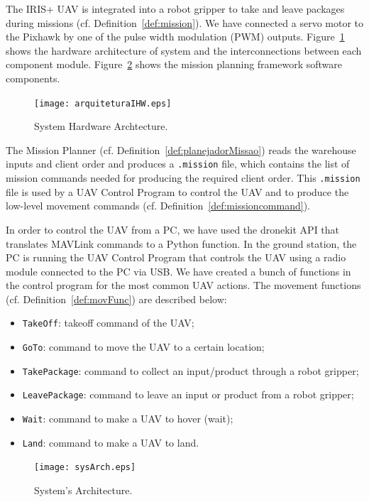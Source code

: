 \documentclass[conference,harvard,brazil,english]{sbatex}
\begin{document}
The IRIS+ UAV is integrated into a robot gripper to take and leave packages during missions (cf. Definition~\ref{def:mission}). We have connected a servo motor to the Pixhawk by one of the pulse width modulation (PWM) outputs. Figure~\ref{fig:hardArch} shows the hardware architecture of system and the interconnections between each component module. Figure~\ref{fig:sysArch} shows the mission planning framework software components.
%
\begin{figure}[H]
	\centering
	\texttt{[image: arquiteturaIHW.eps]}
	\caption{System Hardware Archtecture.}
	\label{fig:hardArch}
\end{figure}

The Mission Planner (cf. Definition~\ref{def:planejadorMissao}) reads the warehouse inputs and client order and produces a \texttt{.mission} file, which contains the list of mission commands needed for producing the required client order. This \texttt{.mission} file is used by a UAV Control Program to control the UAV and to produce the low-level movement commands (cf. Definition~\ref{def:missioncommand}).


In order to control the UAV from a PC, we have used the dronekit API that translates MAVLink commands to a Python function. In the ground station, the PC is running the UAV Control Program that controls the UAV using a radio module connected to the PC via USB. We have created a bunch of functions in the control program for the most common UAV actions. The movement functions (cf. Definition~\ref{def:movFunc}) are described below:
%
\begin{itemize}
\item \texttt{TakeOff}: takeoff command of the UAV;
\item \texttt{GoTo}: command to move the  UAV to a certain location;
\item \texttt{TakePackage}: command to collect an input/product through a robot gripper;
\item \texttt{LeavePackage}: command to leave an input or product from a robot gripper;
\item \texttt{Wait}: command to make a UAV to hover (wait);
\item \texttt{Land}: command to make a UAV to land.
\end{itemize}

\begin{figure}[H]
	\centering
	\texttt{[image: sysArch.eps]}
	\caption{System's Architecture.\label{fig:sysArch}}
\end{figure}
\end{document}
